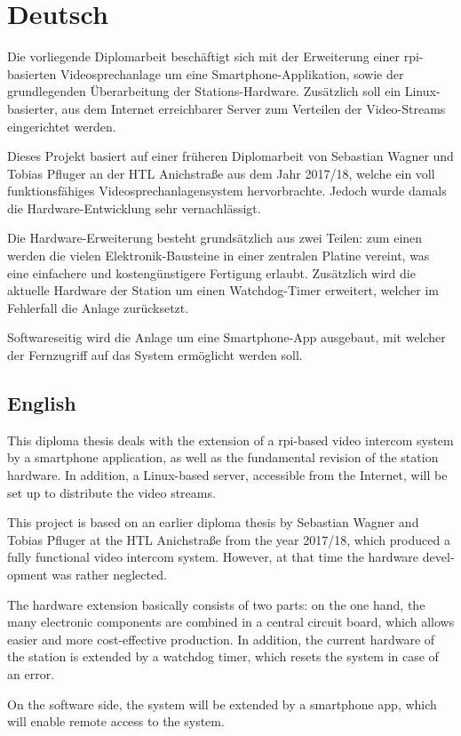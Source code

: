 \section{Deutsch}
Die vorliegende Diplomarbeit beschäftigt sich mit der Erweiterung einer \ac{rpi}-basierten Videosprechanlage um eine Smartphone-Applikation, sowie der grundlegenden Überarbeitung der Stations-Hardware.
Zusätzlich soll ein Linux-basierter, aus dem Internet erreichbarer Server zum Verteilen der Video-Streams eingerichtet werden.
\par
Dieses Projekt basiert auf einer früheren Diplomarbeit von Sebastian Wagner und Tobias Pfluger an der HTL Anichstraße aus dem Jahr 2017/18, welche ein voll funktionsfähiges Videosprechanlagensystem hervorbrachte.
Jedoch wurde damals die Hardware-Entwicklung sehr vernachlässigt.
\par
Die Hardware-Erweiterung besteht grundsätzlich aus zwei Teilen: zum einen werden die vielen Elektronik-Bausteine in einer zentralen Platine vereint, was eine einfachere und kostengünstigere Fertigung erlaubt.
Zusätzlich wird die aktuelle Hardware der Station um einen Watchdog-Timer erweitert, welcher im Fehlerfall die Anlage zurücksetzt.
\par
Softwareseitig wird die Anlage um eine Smartphone-App ausgebaut, mit welcher der Fernzugriff auf das System ermöglicht werden soll.
\par
\newpage

\begin{otherlanguage}{british}
	\section{English}
	This diploma thesis deals with the extension of a \ac{rpi}-based video intercom system by a smartphone application, as well as the fundamental revision of the station hardware.
	In addition, a Linux-based server, accessible from the Internet, will be set up to distribute the video streams.
	\par
	This project is based on an earlier diploma thesis by Sebastian Wagner and Tobias Pfluger at the HTL Anichstraße from the year 2017/18, which produced a fully functional video intercom system.
	However, at that time the hardware development was rather neglected.
	\par
	The hardware extension basically consists of two parts: on the one hand, the many electronic components are combined in a central circuit board, which allows easier and more cost-effective production.
	In addition, the current hardware of the station is extended by a watchdog timer, which resets the system in case of an error.
	\par
	On the software side, the system will be extended by a smartphone app, which will enable remote access to the system.
	\par
\end{otherlanguage}